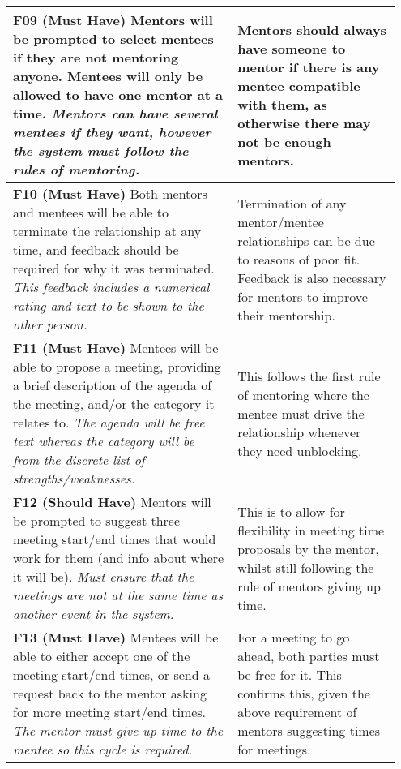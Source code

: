 \documentclass[10pt]{article}
\begin{document}
\begin{longtable}{|p{0.55\linewidth}|p{0.4\linewidth}|}
    \textbf{F09 (Must Have) }
    Mentors will be prompted to select mentees if they are not mentoring anyone.
    Mentees will only be allowed to have one mentor at a time.
    \textit{Mentors can have several mentees if they want, however the system
    must follow the rules of mentoring.}
        &
    Mentors should always have someone to mentor if there is any mentee
    compatible with them, as otherwise there may not be enough mentors.
    \\ \hline

    \textbf{F10 (Must Have) }
    Both mentors and mentees will be able to terminate the relationship at any
    time, and feedback should be required for why it was terminated.
    \textit{This feedback includes a numerical rating and text to be shown to
    the other person.}
        &
    Termination of any mentor/mentee relationships can be due to reasons of poor
    fit. Feedback is also necessary for mentors to improve their mentorship.
    \\ \hline

    \textbf{F11 (Must Have) }
    Mentees will be able to propose a meeting, providing a brief description of
    the agenda of the meeting, and/or the category it relates to.
    \textit{The agenda will be free text whereas the category will be from the
    discrete list of strengths/weaknesses.}
        &
    This follows the first rule of mentoring where the mentee must drive the
    relationship whenever they need unblocking.
    \\ \hline

    \textbf{F12 (Should Have) }
    Mentors will be prompted to suggest three meeting start/end times that would
    work for them (and info about where it will be).
    \textit{Must ensure that the meetings are not at the same time as another
    event in the system.}
        &
    This is to allow for flexibility in meeting time proposals by the mentor,
    whilst still following the rule of mentors giving up time.
    \\ \hline

    \textbf{F13 (Must Have) }
    Mentees will be able to either accept one of the meeting start/end times, or        %
    send a request back to the mentor asking for more meeting start/end times.
    \textit{The mentor must give up time to the mentee so this cycle is required.}
        &
    For a meeting to go ahead, both parties must be free for it. This confirms
    this, given the above requirement of mentors suggesting times for meetings.
    \\ \hline


\end{longtable}
\end{document}
